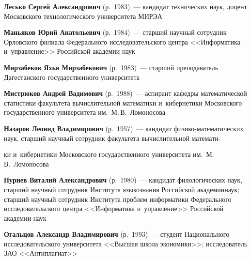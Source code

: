 \begin{multicols}{2}
 

\vspace*{3pt}

\noindent
\textbf{Лесько Сергей Александрович} (р.\ 1983)~--- 
кандидат технических наук, доцент Московского технологического 
университета МИРЭА

\vspace*{3pt}

\noindent
\textbf{Маньяков Юрий Анатольевич} (р.\ 1984)~--- 
старший научный сотрудник Орловского филиала Федерального исследовательского центра 
<<Информатика и~управ\-ле\-ние>> Российской академии наук

\vspace*{3pt}

 \noindent
\textbf{Мирзабеков Яхья Мирзабекович} (р.\ 1983)~--- 
старший преподаватель Дагестанского государственного университета

\vspace*{3pt}

\noindent
\textbf{Мистрюков Андрей Вадимович} (р.\ 1988)~--- 
аспирант кафедры математической статистики факультета вычислительной математики 
и~кибернетики Московского государственного университета им.\ М.\,В.~Ломоносова

\vspace*{3pt}
 
\noindent
\textbf{Назаров Леонид Владимирович} (р.\ 1957)~--- 
кандидат фи\-зи\-ко-ма\-те\-ма\-ти\-че\-ских наук, старший научный 
сотрудник факультета вычислительной математи-\linebreak\vspace*{-12pt}

\pagebreak

\noindent
ки и~кибернетики 
Московского государственного университета им.\ М.\,В.~Ломоносова

\vspace*{3pt}

\noindent
\textbf{Нуриев Виталий Александрович}  (р.\ 1980)~--- 
кандидат филологических наук, старший научный сотрудник Института языкознания 
Российской акаде\-мии\linebreak наук; старший научный со\-труд\-ник
Института проб\-лем информатики Федерального исследовательского цент\-ра 
<<Информатика и~управ\-ле\-ние>> Российской академии наук

\vspace*{3pt}

\noindent
\textbf{Огальцов Александр Владимирович} (р.\ 1993)~--- 
студент Национального исследовательского университета <<Высшая школа экономики>>; 
исследователь ЗАО <<Антиплагиат>>


\end{multicols}
